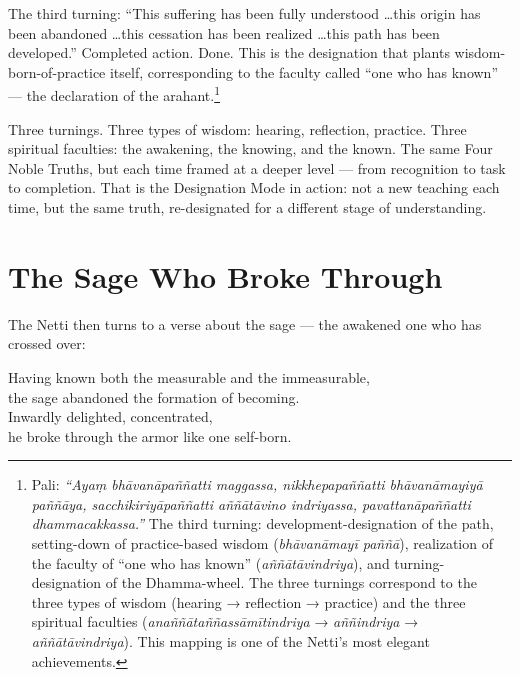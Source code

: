 The third turning: ``This suffering has been fully understood \ldots this origin has been abandoned \ldots this cessation has been realized \ldots this path has been developed.'' Completed action. Done. This is the designation that plants wisdom-born-of-practice itself, corresponding to the faculty called ``one who has known'' --- the declaration of the arahant.\footnote{Pali: \textit{``Ayaṃ bhāvanāpaññatti maggassa, nikkhepapaññatti bhāvanāmayiyā paññāya, sacchikiriyāpaññatti aññātāvino indriyassa, pavattanāpaññatti dhammacakkassa.''} The third turning: development-designation of the path, setting-down of practice-based wisdom (\textit{bhāvanāmayī paññā}), realization of the faculty of ``one who has known'' (\textit{aññātāvindriya}), and turning-designation of the Dhamma-wheel. The three turnings correspond to the three types of wisdom (hearing → reflection → practice) and the three spiritual faculties (\textit{anaññātaññassāmītindriya} → \textit{aññindriya} → \textit{aññātāvindriya}). This mapping is one of the Netti's most elegant achievements.}

Three turnings. Three types of wisdom: hearing, reflection, practice. Three spiritual faculties: the awakening, the knowing, and the known. The same Four Noble Truths, but each time framed at a deeper level --- from recognition to task to completion. That is the Designation Mode in action: not a new teaching each time, but the same truth, re-designated for a different stage of understanding.

\section*{The Sage Who Broke Through}

The Netti then turns to a verse about the sage --- the awakened one who has crossed over:

\begin{versebox}
Having known both the measurable and the immeasurable,\\
the sage abandoned the formation of becoming.\\
Inwardly delighted, concentrated,\\
he broke through the armor like one self-born.
\end{versebox}

